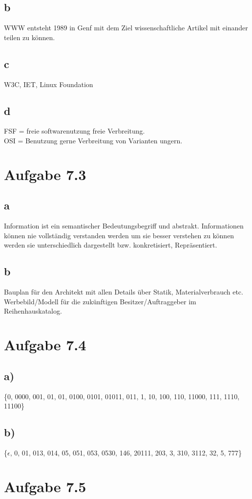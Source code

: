 \documentclass{article}
\begin{document}
	\subsection*{b}
	WWW entsteht 1989 in Genf mit dem Ziel wissenschaftliche Artikel mit einander teilen zu können. 
	\subsection*{c}
	W3C, IET, Linux Foundation 
	\subsection*{d}
	FSF = freie softwarenutzung freie Verbreitung. \\
	OSI = Benutzung gerne Verbreitung von Varianten ungern.
	\section*{Aufgabe 7.3}
	\subsection*{a}
	Information ist ein semantischer Bedeutungsbegriff und abstrakt. Informationen können nie vollständig verstanden werden um sie besser verstehen zu können werden sie unterschiedlich dargestellt bzw. konkretisiert, Repräsentiert.
	\subsection*{b}
	Bauplan für den Architekt mit allen Details über Statik, Materialverbrauch etc. Werbebild/Modell für die zukünftigen Besitzer/Auftraggeber im Reihenhauskatalog.
	
	\section*{Aufgabe 7.4}
	\subsection*{a)}
	\{0, 0000, 001, 01, 01, 0100, 0101, 01011, 011, 1, 10, 100, 110, 11000, 111, 1110, 11100\}
	\subsection*{b)}
	\{$\epsilon$, 0, 01, 013, 014, 05, 051, 053, 0530, 146, 20111, 203, 3, 310, 3112, 32, 5, 777\}
	\section*{Aufgabe 7.5}
\end{document}
